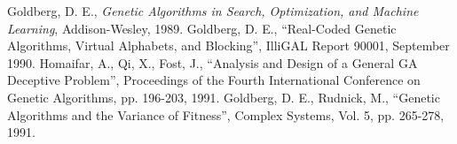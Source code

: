 \begin{thebibliography}{9}
 Goldberg, D. E., {\em Genetic Algorithms in Search,
	Optimization, and Machine Learning}, Addison-Wesley, 1989.
 Goldberg, D. E., ``Real-Coded Genetic Algorithms,
	Virtual Alphabets, and Blocking'', IlliGAL Report 90001, September
	1990.
 Homaifar, A., Qi, X., Fost, J., ``Analysis and
	Design of a General GA Deceptive Problem'', Proceedings of the
	Fourth International Conference on Genetic Algorithms, pp. 196-203,
	1991.
 Goldberg, D. E., Rudnick, M., ``Genetic Algorithms
	and the Variance of Fitness'', Complex Systems, Vol. 5, pp. 265-278,
	1991.
\end{thebibliography}





